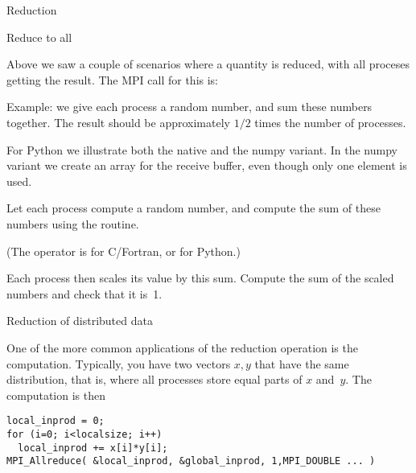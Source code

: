 
 {Reduction}

 {Reduce to all}
\label{sec:allreduce}

Above we saw a couple of scenarios where a quantity is reduced, with
all proceses getting the result. The MPI call for this is:


Example: we give each process a random number, and sum these numbers together.
The result should be approximately $1/2$ times the number of processes.


For Python we illustrate both the native and the numpy variant. In the
numpy variant we create an array for the receive buffer, even though
only one element is used.


\begin{exercise}
  \label{ex:randommaxscale}
  Let each process compute a random number,
  and compute the sum of these numbers using the 
  routine.

  (The operator is  for C/Fortran, or  for
  Python.)
  
  Each process then scales its value
  by this sum. Compute the sum of the scaled numbers and check that it is~1.
\end{exercise}

 {Reduction of distributed data}
\label{sec:dist-reduc}

One of the more common applications of the reduction operation
is the  computation. Typically, you have two vectors $x,y$
that have the same distribution, that is,
where all processes store equal parts of $x$ and~$y$.
The computation is then
\begin{verbatim}
local_inprod = 0;
for (i=0; i<localsize; i++)
  local_inprod += x[i]*y[i];
MPI_Allreduce( &local_inprod, &global_inprod, 1,MPI_DOUBLE ... ) 
\end{verbatim}


